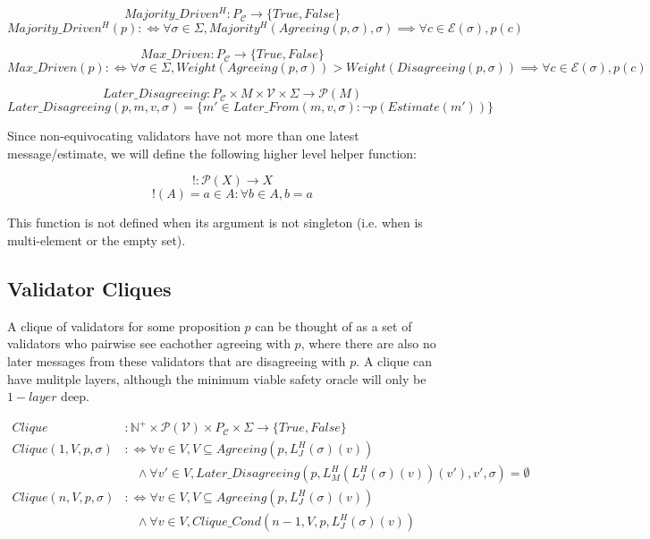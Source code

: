 \begin{defn} %
$$
Majority\_Driven^H: P_{\mathcal{C}} \to \{True, False\}
$$
$$
Majority\_Driven^H(p) :\Leftrightarrow \forall \sigma \in \Sigma, Majority^H(Agreeing(p, \sigma), \sigma) \implies \forall c \in \mathcal{E}(\sigma), p(c)
$$
\end{defn}

\begin{defn}
$$
Max\_Driven: P_{\mathcal{C}} \to \{True, False\}
$$
$$
Max\_Driven(p) :\Leftrightarrow \forall \sigma \in \Sigma, Weight(Agreeing(p, \sigma)) > Weight(Disagreeing(p, \sigma)) \implies \forall c \in \mathcal{E}(\sigma), p(c)
$$
\end{defn}


\begin{defn}
$$
Later\_Disagreeing: P_{\mathcal{C}} \times M \times \mathcal{V} \times \Sigma \to \mathcal{P}(M)
$$
$$
Later\_Disagreeing(p,m,v,\sigma) = \{m' \in Later\_From(m, v, \sigma) : \neg p(Estimate(m')) \}
$$
\end{defn}

Since non-equivocating validators have not more than one latest message/estimate, we will define the following higher level helper function:

\begin{defn}
$$
!: \mathcal{P}(X) \to X
$$
$$
!(A) = a \in A : \forall b \in A, b = a
$$
\end{defn}

This function is not defined when its argument is not singleton (i.e. when is multi-element or the empty set).

\subsection{Validator Cliques}

A clique of validators for some proposition $p$ can be thought of as a set of validators who pairwise see eachother agreeing with $p$, where there are also no later messages from these validators that are disagreeing with $p$. A clique can have mulitple layers, although the minimum viable safety oracle will only be $1-layer$ deep. \\

\begin{defn}
\begin{align}
Clique&: \mathbb{N}^+ \times \mathcal{P}(\mathcal{V}) \times P_{\mathcal{C}} \times \Sigma \to \{True, False\} \\
Clique(1, V, p, \sigma) &:\Leftrightarrow \forall v \in V, V \subseteq Agreeing(p, L^H_J(\sigma)(v)) \\
&~~~~\land \forall v' \in V, Later\_Disagreeing(p, L^H_M(L^H_J(\sigma)(v))(v'), v', \sigma) = \emptyset \\
Clique(n, V, p, \sigma) &:\Leftrightarrow \forall v \in V, V \subseteq Agreeing(p, L^H_J(\sigma)(v)) \\
&~~~~\land \forall v \in V, Clique\_Cond(n - 1, V, p, L^H_J(\sigma)(v))
\end{align}
\end{defn}


